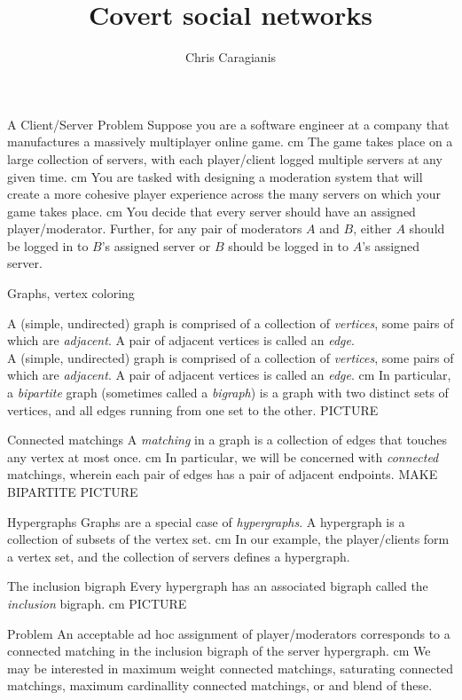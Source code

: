 \documentclass{beamer}
\title{Covert social networks}
\author{Chris Caragianis}
\institute[U of L]{ Department of Mathematics\ University of Louisville\ Louisville, KY 40292\\[1ex]


   \texttt{cjcara01@louisville.edu} }
\newcommand{\bframe}[2]{\begin{frame}{#1} #2 \end{frame}}
\begin{document}


\bframe{A Client/Server Problem}{
 	Suppose you are a software engineer at a company that manufactures a massively multiplayer online game. \pause\vskip 0.5 cm
	The game takes place on a large collection of servers, with each player/client logged multiple servers at any given time.\pause \vskip 0.5 cm
	You are tasked with designing a moderation system that will create a more cohesive player experience across the many servers on which your game takes place. \pause\vskip 0.5 cm 
	You decide that every server should have an assigned player/moderator. Further, for any pair of moderators $A$ and $B$, either $A$ should be logged in to $B$'s assigned server or $B$ should be logged in to $A$'s assigned server. 
}	

\bframe{Graphs, vertex coloring}{
	\begin{overprint} 
		\onslide<1>A (simple, undirected) graph is comprised of a collection of \textit{vertices}, some pairs of which are \textit{adjacent}.  A pair of adjacent vertices is called an \textit{edge}. \\
		\onslide<2-3>A (simple, undirected) graph is comprised of a collection of \textit{vertices}, some pairs of which are \textit{adjacent}.  A pair of adjacent vertices is called an \textit{edge}. \vskip 0.5 cm 
 	In particular, a {\it bipartite} graph (sometimes called a {\it bigraph}) is a graph with two distinct sets of vertices, and all edges running from one set to the other. PICTURE
	\end{overprint}
}

\bframe{Connected matchings}{A {\it matching} in a graph is a collection of edges that touches any vertex at most once.  \pause\vskip 0.5 cm
In particular, we will be concerned with \textit{connected} matchings, wherein each pair of edges has a pair of adjacent endpoints. MAKE BIPARTITE PICTURE
	 }

\bframe{Hypergraphs}{
 	Graphs are a special case of {\it hypergraphs}.  A hypergraph is a collection of subsets of the vertex set. \pause\vskip 0.5 cm
 	In our example, the player/clients form a vertex set, and the collection of servers defines a hypergraph.
}

\bframe{The inclusion bigraph}{
 	Every hypergraph has an associated bigraph called the {\it inclusion} bigraph.  \pause{} cm
	PICTURE
}

\bframe{Problem}{
 	An acceptable ad hoc assignment of player/moderators corresponds to a connected matching in the inclusion bigraph of the server hypergraph.  \pause\vskip 0.5 cm 
 	We may be interested in maximum weight connected matchings, saturating connected matchings, maximum cardinallity connected matchings, or and blend of these.
}
\end{document}
